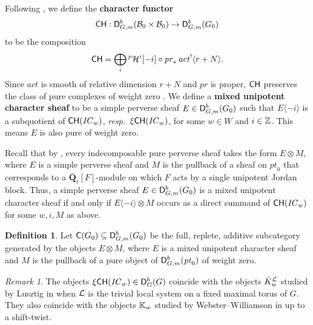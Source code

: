 \documentclass[a4paper,10pt,leqno]{amsart}
\theoremstyle{plain}
\theoremstyle{plain}
\theoremstyle{plain}
\theoremstyle{definition}
\newtheorem{df}[thm]{Definition}
\theoremstyle{remark}
\newtheorem{rem}[thm]{Remark}
\newcommand{\dfemph}[1]{\textbf{#1}}
\newcommand{\IC}{\mathit{IC}}
\newcommand{\QL}{\bar{\mathbf{Q}}_\ell}
\newcommand{\act}{\mathit{act}}
\newcommand{\point}{\mathit{pt}}
\renewcommand{\pr}{\mathit{pr}}
\begin{document}
Following \cite{lusztig_1985_1}, we define the \dfemph{character functor}
\begin{align}
\sf{CH} : \sf{D}_{G, m}^b(\cal{B}_0 \times \cal{B}_0) \to \sf{D}_{G, m}^b(G_0)
\end{align}
to be the composition
\begin{align}\label{eq:horocycle-transform}\begin{split}
\sf{CH} = \bigoplus_i {}^p\cal{H}^i[-i] \circ \pr_\ast\, \act^!\langle r + N\rangle.
\end{split}\end{align}
Since $\act$ is smooth of relative dimension $r + N$ and $\pr$ is proper, $\sf{CH}$ preserves the class of pure complexes of weight zero \cite{deligne_1980}.
We define a \dfemph{mixed unipotent character sheaf} to be a simple perverse sheaf $E \in \sf{D}_{G, m}^b(G_0)$ such that $E\langle -i\rangle$ is a subquotient of $\sf{CH}(\IC_w)$, \emph{resp.}\ $\xi\sf{CH}(\IC_w)$, for some $w \in W$ and $i \in \bb{Z}$.
This means $E$ is also pure of weight zero.

Recall that by \cite[Prop.\ 5.3.9]{bbd}, every indecomposable pure perverse sheaf takes the form $E \otimes M$, where $E$ is a simple perverse sheaf and $M$ is the pullback of a sheaf on $\point_0$ that corresponds to a $\QL[F]$-module on which $F$ acts by a single unipotent Jordan block.
Thus, a simple perverse sheaf $E \in \sf{D}_{G, m}^b(G_0)$ is a mixed unipotent character sheaf if and only if $E\langle -i\rangle \otimes M$ occurs as a direct summand of $\sf{CH}(\IC_w)$ for some $w, i, M$ as above.

\begin{df}
Let $\sf{C}(G_0) \subseteq \sf{D}_{G, m}^b(G_0)$ be the full, replete, additive subcategory generated by the objects $E \otimes M$, where $E$ is a mixed unipotent character sheaf and $M$ is the pullback of a pure object of $\sf{D}_{G, m}^b(\point_0)$ of weight zero.
\end{df}

\begin{rem}
The objects $\xi \sf{CH}(\IC_w) \in \sf{D}_G^b(G)$ coincide with the objects $\bar{K}_w^\cal{L}$ studied by Lusztig in \cite{lusztig_1985_3} when $\cal{L}$ is the trivial local system on a fixed maximal torus of $G$.
They also coincide with the objects $\bb{K}_w$ studied by Webster--Williamson in \cite{ww_2011} up to a shift-twist.
\end{rem}

\subsection{}
\end{document}
